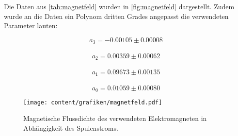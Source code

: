     Die Daten aus \autoref{tab:magnetfeld} wurden in \autoref{fig:magnetfeld} dargestellt. Zudem wurde 
    an die Daten ein Polynom dritten Grades angepasst die verwendeten Parameter lauten:
    \begin{center}
        $$a_3 = -0.00105 \pm 0.00008$$\\
        $$a_2 =  0.00359 \pm 0.00062$$\\
        $$a_1 =  0.09673 \pm 0.00135$$\\
        $$a_0 =  0.01059 \pm 0.00080$$
        
    \end{center}

    \begin{figure}
        \centering
        \texttt{[image: content/grafiken/magnetfeld.pdf]}
        \caption{Magnetische Flussdichte des verwendeten Elektromagneten in Abhängigkeit des Spulenstroms.}
        \label{fig:magnetfeld}
      \end{figure}

      
      
      
      
      
      
      
      